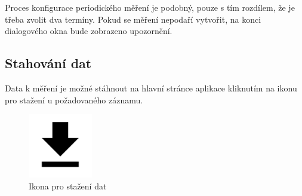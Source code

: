 \documentclass[12pt]{article}
\begin{document}
\begin{teamwork}
        Proces konfigurace periodického měření je podobný, pouze s tím rozdílem, že je třeba zvolit dva termíny.
        Pokud se měření nepodaří vytvořit, na konci dialogového okna bude zobrazeno upozornění.



        \subsection{Stahování dat}\label{subsec:stahovani-dat}

        Data k měření je možné stáhnout na hlavní stránce aplikace kliknutím na ikonu pro stažení u požadovaného záznamu.

        \begin{figure}[hbt!]
            \centering
            \includegraphics[width=0.25\textwidth]{../../img/download_icon}
            \caption{Ikona pro stažení dat}
            \label{fig:dowload_icon}
        \end{figure}

    \end{teamwork}
\end{document}
